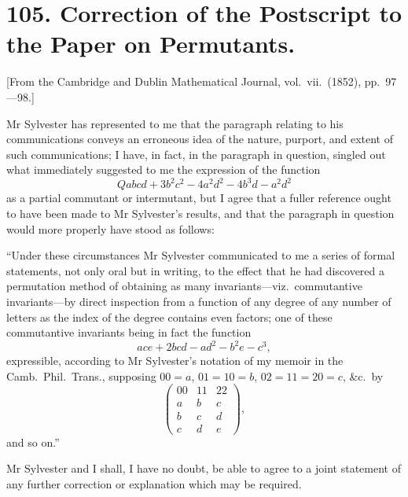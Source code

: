 \documentclass[11pt,a4paper]{book}
\begin{document}
\section*{105. Correction of the Postscript to the Paper on Permutants.}

[From the Cambridge and Dublin Mathematical Journal, vol.\ vii.\ (1852), pp.\ 97---98.]

Mr Sylvester has represented to me that the paragraph relating to his communications conveys an erroneous idea of the nature, purport, and extent of such communications; I have, in fact, in the paragraph in question, singled out what immediately suggested to me the expression of the function
\[Qabcd + 3b^2c^2 - 4a^2d^2 - 4b^3d - a^2d^2\]
as a partial commutant or intermutant, but I agree that a fuller reference ought to have been made to Mr Sylvester's results, and that the paragraph in question would more properly have stood as follows:

``Under these circumstances Mr Sylvester communicated to me a series of formal statements, not only oral but in writing, to the effect that he had discovered a permutation method of obtaining as many invariants---viz.\ commutantive invariants---by direct inspection from a function of any degree of any number of letters as the index of the degree contains even factors; one of these commutantive invariants being in fact the function
\[ace + 2bcd - ad^2 - b^2e - c^3,\]
expressible, according to Mr Sylvester's notation of my memoir in the Camb.\ Phil.\ Trans., supposing $00=a$, $01=10=b$, $02=11=20=c$, \&c.\ by
\[\begin{pmatrix} 00 & 11 & 22 \\ a & b & c \\ b & c & d \\ c & d & e \end{pmatrix},\]
and so on.''

Mr Sylvester and I shall, I have no doubt, be able to agree to a joint statement of any further correction or explanation which may be required.
\clearpage

\end{document}

